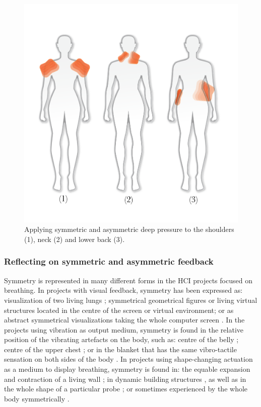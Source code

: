  \begin{figure}[t]
  \centering
  \includegraphics[width=0.65\linewidth]{Chapters/Figures/soma_chi/fig6_positions_numbers.png}
  \caption[Applying symmetric and asymmetric deep pressure]{Applying symmetric and asymmetric deep pressure to the shoulders (1), neck (2) and lower back (3).}
    \label{fig:neck}
\end{figure}

\subsubsection*{Reflecting on symmetric and asymmetric feedback}

Symmetry is represented in many different forms in the HCI projects focused on breathing. In  projects with visual feedback, symmetry has been expressed as: visualization of two living lungs \cite{abushakra_augmenting_2014}; symmetrical  geometrical figures \cite{van_rooij_deep_2016, prpa_hacking_2016} or living virtual structures \cite{patibanda_life_2017} located in the centre of the screen or virtual environment; or as abstract symmetrical visualizations taking the whole computer screen \cite{moraveji_breathtray_2012}.
In the projects using vibration as output medium, symmetry is found in the relative position of the vibrating artefacts on the body, such as: centre of the belly \cite{bumatay_investigating_2017}; centre of the upper chest \cite{frey_breeze_2018}; or in the blanket that has the same vibro-tactile sensation on both sides of the body \cite{dijk_breathe_2011}. In projects using shape-changing actuation as a medium to display breathing, symmetry is found in: the equable expansion and contraction of a living wall \cite{sjoman_breathing_2018}; in dynamic building structures \cite{moran_exopranayama_2016, schnadelbach_exobuilding_2012}, as well as in the whole shape of a particular probe \cite{aslan_hold_2016, kim_breathingframe_2015}; or sometimes experienced by the whole body symmetrically \cite{sun_breath_2017}.

